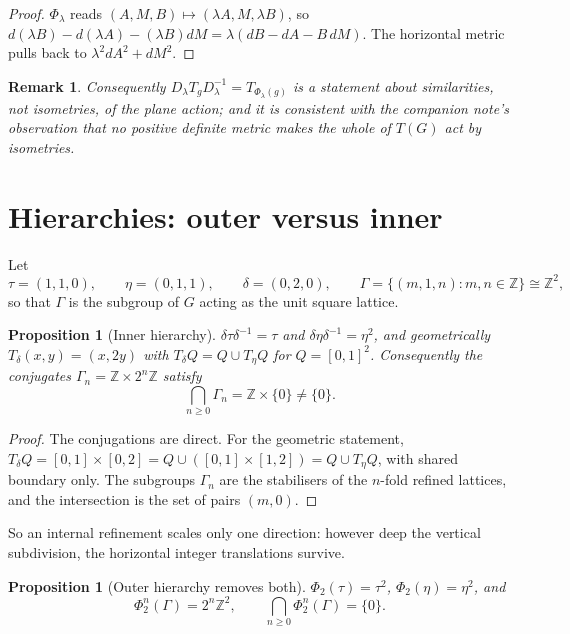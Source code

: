 \documentclass[11pt]{article}
\newtheorem{proposition}[theorem]{Proposition}
\newtheorem{remark}[theorem]{Remark}
\begin{document}
\begin{proof}
$\Phi_\lambda$ reads $(A,M,B)\mapsto(\lambda A,M,\lambda B)$, so
$d(\lambda B)-d(\lambda A)-(\lambda B)dM=\lambda(dB-dA-B\,dM)$. The horizontal
metric pulls back to $\lambda^2dA^2+dM^2$.
\end{proof}

\begin{remark}
Consequently $D_\lambda T_gD_\lambda^{-1}=T_{\Phi_\lambda(g)}$ is a statement
about \emph{similarities}, not isometries, of the plane action; and it is
consistent with the companion note's observation that no positive definite
metric makes the whole of $T(G)$ act by isometries.
\end{remark}

\section{Hierarchies: outer versus inner}
\label{sec:hierarchy}

Let
\[
\tau=(1,1,0),\qquad \eta=(0,1,1),\qquad \delta=(0,2,0),
\qquad \Gamma=\{(m,1,n):m,n\in\mathbb Z\}\cong\mathbb Z^2,
\]
so that $\Gamma$ is the subgroup of $G$ acting as the unit square lattice.

\begin{proposition}[Inner hierarchy]
\label{prop:inner-hierarchy}
$\delta\tau\delta^{-1}=\tau$ and $\delta\eta\delta^{-1}=\eta^2$, and
geometrically $T_\delta(x,y)=(x,2y)$ with $T_\delta Q=Q\cup T_\eta Q$ for
$Q=[0,1]^2$. Consequently the conjugates $\Gamma_n=\mathbb Z\times2^n\mathbb Z$
satisfy
\[
\bigcap_{n\ge0}\Gamma_n=\mathbb Z\times\{0\}\ne\{0\}.
\]
\end{proposition}

\begin{proof}
The conjugations are direct. For the geometric statement,
$T_\delta Q=[0,1]\times[0,2]=Q\cup([0,1]\times[1,2])=Q\cup T_\eta Q$, with
shared boundary only. The subgroups $\Gamma_n$ are the stabilisers of the
$n$-fold refined lattices, and the intersection is the set of pairs $(m,0)$.
\end{proof}

So an internal refinement scales only one direction: however deep the vertical
subdivision, the horizontal integer translations survive.

\begin{proposition}[Outer hierarchy removes both]
\label{prop:outer-hierarchy}
$\Phi_2(\tau)=\tau^2$, $\Phi_2(\eta)=\eta^2$, and
\[
\Phi_2^n(\Gamma)=2^n\mathbb Z^2,
\qquad
\bigcap_{n\ge0}\Phi_2^n(\Gamma)=\{0\}.
\]
\end{proposition}
\end{document}
